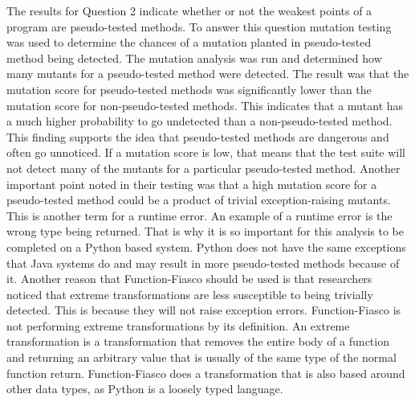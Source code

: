 The results for Question 2 indicate whether or not the weakest points of a program are pseudo-tested methods. To answer this question mutation testing was used to determine the chances of a mutation planted in pseudo-tested method being detected. The mutation analysis was run and determined how many mutants for a pseudo-tested method were detected. The result was that the mutation score for pseudo-tested methods was significantly lower than the mutation score for non-pseudo-tested methods. This indicates that a mutant has a much higher probability to go undetected than a non-pseudo-tested method. This finding supports the idea that pseudo-tested methods are dangerous and often go unnoticed. If a mutation score is low, that means that the test suite will not detect many of the mutants for a particular pseudo-tested method. Another important point noted in their testing was that a high mutation score for a pseudo-tested method could be a product of trivial exception-raising mutants. This is another term for a runtime error. An example of a runtime error is the wrong type being returned. That is why it is so important for this analysis to be completed on a Python based system. Python does not have the same exceptions that Java systems do and may result in more pseudo-tested methods because of it. Another reason that Function-Fiasco should be used is that researchers noticed that extreme transformations are less susceptible to being trivially detected. This is because they will not raise exception errors. Function-Fiasco is not performing extreme transformations by its definition. An extreme transformation is a transformation that removes the entire body of a function and returning an arbitrary value that is usually of the same type of the normal function return. Function-Fiasco does a transformation that is also based around other data types, as Python is a loosely typed language.

